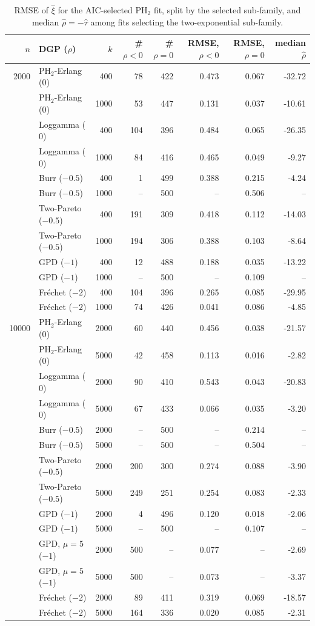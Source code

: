 \begin{table}[t]
\centering
\footnotesize
\setlength{\tabcolsep}{4pt}
\caption{RMSE of $\hat\xi$ for the AIC-selected PH$_2$ fit, split by the selected sub-family, and median $\hat\rho=-\hat\tau$ among fits selecting the two-exponential sub-family.}
\label{tab:cond}
\begin{tabular}{rlrrrrrr}
\toprule
$n$ & DGP ($\rho$) & $k$ & \#$\rho<0$ & \#$\rho=0$ & RMSE, $\rho<0$ & RMSE, $\rho=0$ & median $\hat\rho$ \\
\midrule
2000 & PH$_2$-Erlang ($0$) & 400 & 78 & 422 & 0.473 & 0.067 & -32.72 \\
 & PH$_2$-Erlang ($0$) & 1000 & 53 & 447 & 0.131 & 0.037 & -10.61 \\
 & Loggamma ($0$) & 400 & 104 & 396 & 0.484 & 0.065 & -26.35 \\
 & Loggamma ($0$) & 1000 & 84 & 416 & 0.465 & 0.049 & -9.27 \\
 & Burr ($-0.5$) & 400 & 1 & 499 & 0.388 & 0.215 & -4.24 \\
 & Burr ($-0.5$) & 1000 & -- & 500 & -- & 0.506 & -- \\
 & Two-Pareto ($-0.5$) & 400 & 191 & 309 & 0.418 & 0.112 & -14.03 \\
 & Two-Pareto ($-0.5$) & 1000 & 194 & 306 & 0.388 & 0.103 & -8.64 \\
 & GPD ($-1$) & 400 & 12 & 488 & 0.188 & 0.035 & -13.22 \\
 & GPD ($-1$) & 1000 & -- & 500 & -- & 0.109 & -- \\
 & Fr\'echet ($-2$) & 400 & 104 & 396 & 0.265 & 0.085 & -29.95 \\
 & Fr\'echet ($-2$) & 1000 & 74 & 426 & 0.041 & 0.086 & -4.85 \\
\midrule
10000 & PH$_2$-Erlang ($0$) & 2000 & 60 & 440 & 0.456 & 0.038 & -21.57 \\
 & PH$_2$-Erlang ($0$) & 5000 & 42 & 458 & 0.113 & 0.016 & -2.82 \\
 & Loggamma ($0$) & 2000 & 90 & 410 & 0.543 & 0.043 & -20.83 \\
 & Loggamma ($0$) & 5000 & 67 & 433 & 0.066 & 0.035 & -3.20 \\
 & Burr ($-0.5$) & 2000 & -- & 500 & -- & 0.214 & -- \\
 & Burr ($-0.5$) & 5000 & -- & 500 & -- & 0.504 & -- \\
 & Two-Pareto ($-0.5$) & 2000 & 200 & 300 & 0.274 & 0.088 & -3.90 \\
 & Two-Pareto ($-0.5$) & 5000 & 249 & 251 & 0.254 & 0.083 & -2.33 \\
 & GPD ($-1$) & 2000 & 4 & 496 & 0.120 & 0.018 & -2.06 \\
 & GPD ($-1$) & 5000 & -- & 500 & -- & 0.107 & -- \\
 & GPD, $\mu=5$ ($-1$) & 2000 & 500 & -- & 0.077 & -- & -2.69 \\
 & GPD, $\mu=5$ ($-1$) & 5000 & 500 & -- & 0.073 & -- & -3.37 \\
 & Fr\'echet ($-2$) & 2000 & 89 & 411 & 0.319 & 0.069 & -18.57 \\
 & Fr\'echet ($-2$) & 5000 & 164 & 336 & 0.020 & 0.085 & -2.31 \\
\bottomrule
\end{tabular}
\end{table}
